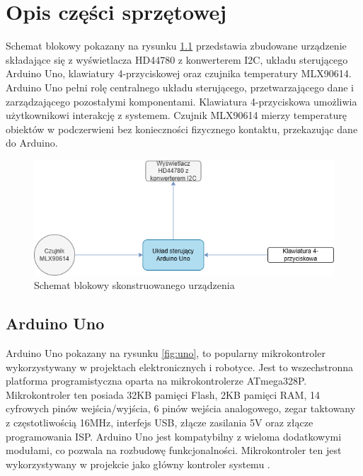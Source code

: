 \chapter{Opis części sprzętowej}

    Schemat blokowy pokazany na rysunku \ref{fig:schemat} przedstawia zbudowane urządzenie składające się z wyświetlacza HD44780 z konwerterem I2C, układu sterującego Arduino Uno, klawiatury 4-przyciskowej oraz czujnika temperatury MLX90614. Arduino Uno pełni rolę centralnego układu sterującego, przetwarzającego dane i zarządzającego pozostałymi komponentami. Klawiatura 4-przyciskowa umożliwia użytkownikowi interakcję z systemem. Czujnik MLX90614 mierzy temperaturę obiektów w podczerwieni bez konieczności fizycznego kontaktu, przekazując dane do Arduino.
    
    \vspace{12pt}

    \begin{figure}[h!]
        \centering
        \includegraphics[width=1\textwidth]{images/schemat.png}
        \caption{Schemat blokowy skonstruowanego urządzenia} 
        \label{fig:schemat}
    \end{figure}

\section{Arduino Uno}

    Arduino Uno pokazany na rysunku \ref{fig:uno}, to popularny mikrokontroler wykorzystywany w projektach elektronicznych i robotyce. Jest to wszechstronna platforma programistyczna oparta na mikrokontrolerze ATmega328P. Mikrokontroler ten posiada 32KB pamięci Flash, 2KB pamięci RAM, 14 cyfrowych pinów wejścia/wyjścia, 6 pinów wejścia analogowego, zegar taktowany z częstotliwością 16MHz, interfejs USB, złącze zasilania 5V oraz złącze programowania ISP. Arduino Uno jest kompatybilny z wieloma dodatkowymi modułami, co pozwala na rozbudowę funkcjonalności. Mikrokontroler ten jest wykorzystywany w projekcie jako główny kontroler systemu \cite{5}.

